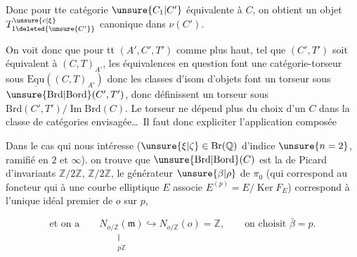 Donc pour tte catégorie $\unsure{C_1|C'}$ équivalente à $C$,
on obtient un objet $T_{1\deleted{\unsure{C'}}}^{\unsure{c|\xi}}$ canonique dans $\nu(C')$.

On voit donc que pour tt $(A',C',T')$ comme
plus haut,  tel que $(C',T')$ soit
équivalent à $(C,T)_{A'}$, les équivalences
en question font une catégorie-torseur sous
$\underline{\mathrm{Equ}}((C,T)_{A'})$  donc 
les classes d'isom d'objets font
un torseur sous 
$\unsure{\mathrm{Brd}|\mathrm{Bord}}(C',T')$, donc définissent un torseur sous
$\mathrm{Brd}(C',T')/\operatorname{Im}\mathrm{Brd}(C)$. Le torseur ne dépend
plus du choix d'un $C$ dans la classe
de catégories envisagée\ldots\ Il faut donc expliciter
l'application composée



Dans le cas qui nous intéresse ($\unsure{\xi|\zeta}\in\mathrm{Br}(\mathbb Q)$
d'indice $\unsure{n=2}$, ramifié  en $2$ et $\infty$). 
on trouve que $\unsure{\mathrm{Brd}|\mathrm{Bord}}(C)$ est la  de Picard
 d'invariants $\mathbb Z/2\mathbb Z$, $\mathbb Z/2\mathbb Z$, le générateur
$\unsure{\beta|\rho}$ de $\pi_0$ (qui correspond au  foncteur
qui à une courbe elliptique $E$ associe $E^{(p)}=E/\operatorname{Ker} F_E$)
correspond à l'unique idéal premier  de $o$ sur $p$,

\[
\text{et on a}\qquad \underset{\substack{\Vert\\p\mathbb Z}}{N_{o/\mathbb Z}(\mathfrak m)}
\hookrightarrow N_{o/\mathbb Z}(o)=\mathbb Z,\qquad \text{on choisit }\bar\beta=p.
\]

